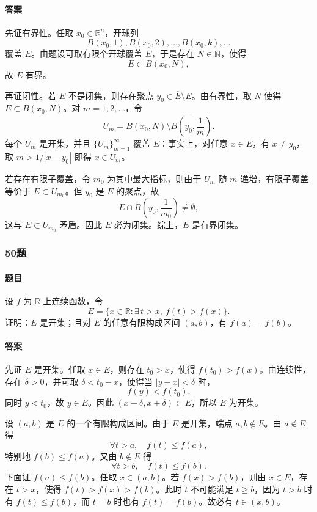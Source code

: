 \documentclass{article}
\begin{document}
	\paragraph{答案} 先证有界性。任取 $x_0\in\mathbb{R}^n$，开球列
	\[
	B(x_0,1),B(x_0,2),\ldots,B(x_0,k),\ldots
	\]
	覆盖 $E$。由题设可取有限个开球覆盖 $E$，于是存在 $N\in\mathbb{N}$，使得
	\[
	E\subset B(x_0,N),
	\]
	故 $E$ 有界。
	
	再证闭性。若 $E$ 不是闭集，则存在聚点 $y_0\in\overline E\setminus E$。由有界性，取 $N$ 使得 $E\subset B(x_0,N)$。对 $m=1,2,\ldots$，令
	\[
	U_m=B(x_0,N)\setminus \overline{B\left(y_0,\frac1m\right)}.
	\]
	每个 $U_m$ 是开集，并且 $\{U_m\}_{m=1}^{\infty}$ 覆盖 $E$：事实上，对任意 $x\in E$，有 $x\neq y_0$，取 $m>1/|x-y_0|$ 即得 $x\in U_m$。
	
	若存在有限子覆盖，令 $m_0$ 为其中最大指标，则由于 $U_m$ 随 $m$ 递增，有限子覆盖等价于 $E\subset U_{m_0}$。但 $y_0$ 是 $E$ 的聚点，故
	\[
	E\cap B\left(y_0,\frac1{m_0}\right)\neq\emptyset,
	\]
	这与 $E\subset U_{m_0}$ 矛盾。因此 $E$ 必为闭集。综上，$E$ 是有界闭集。
	
	\subsubsection*{50题}
	\paragraph{题目} 设 $f$ 为 $\mathbb{R}$ 上连续函数，令
	\[
	E=\{x\in\mathbb{R}:\exists\,t>x,\ f(t)>f(x)\}.
	\]
	证明：$E$ 是开集；且对 $E$ 的任意有限构成区间 $(a,b)$，有 $f(a)=f(b)$。
	
	\paragraph{答案} 先证 $E$ 是开集。任取 $x\in E$，则存在 $t_0>x$，使得 $f(t_0)>f(x)$。由连续性，存在 $\delta>0$，并可取 $\delta<t_0-x$，使得当 $|y-x|<\delta$ 时，
	\[
	f(y)<f(t_0).
	\]
	同时 $y<t_0$，故 $y\in E$。因此 $(x-\delta,x+\delta)\subset E$，所以 $E$ 为开集。
	
	设 $(a,b)$ 是 $E$ 的一个有限构成区间。由于 $E$ 是开集，端点 $a,b\notin E$。由 $a\notin E$ 得
	\[
	\forall t>a,\quad f(t)\le f(a),
	\]
	特别地 $f(b)\le f(a)$。又由 $b\notin E$ 得
	\[
	\forall t>b,\quad f(t)\le f(b).
	\]
	下面证 $f(a)\le f(b)$。任取 $x\in(a,b)$。若 $f(x)>f(b)$，则由 $x\in E$，存在 $t>x$，使得 $f(t)>f(x)>f(b)$。此时 $t$ 不可能满足 $t\ge b$，因为 $t>b$ 时有 $f(t)\le f(b)$，而 $t=b$ 时也有 $f(t)=f(b)$。故必有 $t\in(x,b)$。
	
\end{document}
